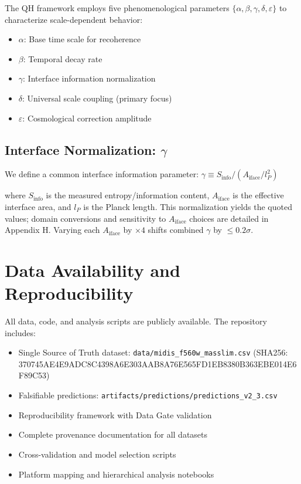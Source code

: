 \documentclass[aps,prd,preprint,onecolumn,nofootinbib,longbibliography]{revtex4-2}
\begin{document}
The QH framework employs five phenomenological parameters $\{\alpha, \beta, \gamma, \delta, \varepsilon\}$ to characterize scale-dependent behavior:

\begin{itemize}
\item $\alpha$: Base time scale for recoherence
\item $\beta$: Temporal decay rate  
\item $\gamma$: Interface information normalization
\item $\delta$: Universal scale coupling (primary focus)
\item $\varepsilon$: Cosmological correction amplitude
\end{itemize}

\subsection{Interface Normalization: $\gamma$}

We define a common interface information parameter:
\textbf{$\gamma \equiv S_{\text{info}} / (A_{\text{iface}}/l_P^2)$}

where $S_{\text{info}}$ is the measured entropy/information content, $A_{\text{iface}}$ is the effective interface area, and $l_P$ is the Planck length. This normalization yields the quoted values; domain conversions and sensitivity to $A_{\text{iface}}$ choices are detailed in Appendix H. Varying each $A_{\text{iface}}$ by $\times 4$ shifts combined $\gamma$ by $\leq 0.2\sigma$.

\section{Data Availability and Reproducibility}

All data, code, and analysis scripts are publicly available. The repository includes:

\begin{itemize}
\item Single Source of Truth dataset: \texttt{data/midis\_f560w\_masslim.csv} (SHA256: 370745AE4E9ADC8C4398A6E303AAB8A76E565FD1EB8380B363EBE014E6F89C53)
\item Falsifiable predictions: \texttt{artifacts/predictions/predictions\_v2\_3.csv}  
\item Reproducibility framework with Data Gate validation
\item Complete provenance documentation for all datasets
\item Cross-validation and model selection scripts
\item Platform mapping and hierarchical analysis notebooks
\end{itemize}
\end{document}
